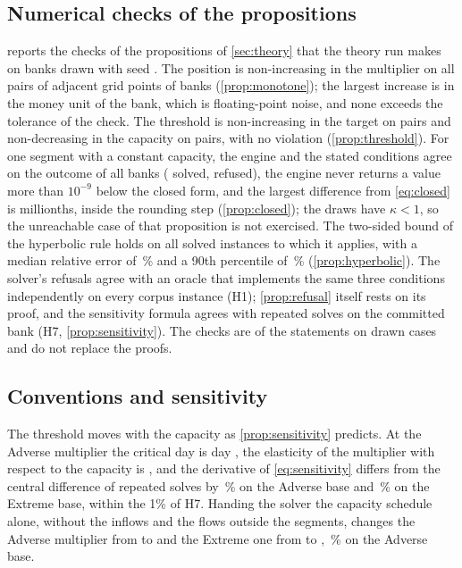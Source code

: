 \subsection{Numerical checks of the propositions}

 reports the checks of the propositions of \cref{sec:theory} that the theory run makes on banks drawn with seed \thSeed{}. The position is non-increasing in the multiplier on all \thMonoCmp{} pairs of adjacent grid points of \thMonoBanks{} banks (\cref{prop:monotone}); the largest increase is \thMonoLarge{} in the money unit of the bank, which is floating-point noise, and none exceeds the tolerance of the check. The threshold is non-increasing in the target on \thTgtPairs{} pairs and non-decreasing in the capacity on \thCapPairs{} pairs, with no violation (\cref{prop:threshold}). For one segment with a constant capacity, the engine and the stated conditions agree on the outcome of all \thCfN{} banks (\thCfSolved{} solved, \thCfRefused{} refused), the engine never returns a value more than $10^{-9}$ below the closed form, and the largest difference from \cref{eq:closed} is \thCfMax{} millionths, inside the rounding step (\cref{prop:closed}); the draws have $\kappa<1$, so the unreachable case of that proposition is not exercised. The two-sided bound of the hyperbolic rule holds on all \thHypN{} solved instances to which it applies, with a median relative error of \thHypMed{}\,\% and a 90th percentile of \thHypQninety{}\,\% (\cref{prop:hyperbolic}). The solver's refusals agree with an oracle that implements the same three conditions independently on every corpus instance (H1); \cref{prop:refusal} itself rests on its proof, and the sensitivity formula agrees with repeated solves on the committed bank (H7, \cref{prop:sensitivity}). The checks are of the statements on drawn cases and do not replace the proofs.



\subsection{Conventions and sensitivity}

The threshold moves with the capacity as \cref{prop:sensitivity} predicts. At the Adverse multiplier the critical day is day \dayZeroAdv{}, the elasticity of the multiplier with respect to the capacity is \elastAdv{}, and the derivative of \cref{eq:sensitivity} differs from the central difference of repeated solves by \derivRelAdv{}\,\% on the Adverse base and \derivRelExt{}\,\% on the Extreme base, within the 1\% of H7. Handing the solver the capacity schedule alone, without the inflows and the flows outside the segments, changes the Adverse multiplier from \mAdv{} to \rawAdv{} and the Extreme one from \mExt{} to \rawExt{}, \rawAdvPct{}\,\% on the Adverse base.

